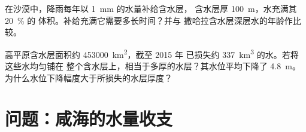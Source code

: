 \begin{exercise}[$\star\star\star$]\label{exo:g10:freshwater-resources:14}
在沙漠中，降雨每年以 \qty{1}{mm} 的水量补给含水层，
含水层厚 \qty{100}{m}，水充满其 \qty{20}{\percent} 的
体积。补给充满它需要多长时间？并与
撒哈拉含水层深层水的年龄作比较。
\end{exercise}

\begin{exercise}[$\star\star\star$]\label{exo:g10:freshwater-resources:15}
高平原含水层面积约 \qty{453000}{km^2}，截至 2015 年
已损失约 \qty{337}{km^3} 的水。若将这些水均匀铺在
整个含水层上，相当于多厚的水层？其水位平均下降了 \qty{4.8}{m}。
为什么水位下降幅度大于所损失的水层厚度？
\end{exercise}

\section{问题：咸海的水量收支}

